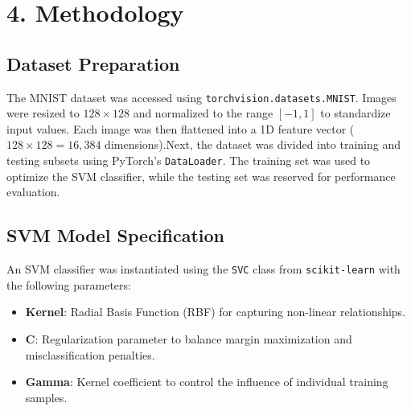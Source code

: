 \documentclass{article}
\begin{document}


\section*{4. Methodology}

\subsection*{Dataset Preparation}
The MNIST dataset was accessed using \texttt{torchvision.datasets.MNIST}. Images were resized to $128 \times 128$ and normalized to the range $[-1, 1]$ to standardize input values. Each image was then flattened into a 1D feature vector ($128 \times 128 = 16,384$ dimensions).Next, the dataset was divided into training and testing subsets using PyTorch's \texttt{DataLoader}. The training set was used to optimize the SVM classifier, while the testing set was reserved for performance evaluation.

\subsection*{SVM Model Specification}
An SVM classifier was instantiated using the \texttt{SVC} class from \texttt{scikit-learn} with the following parameters:
\begin{itemize}
    \item \textbf{Kernel}: Radial Basis Function (RBF) for capturing non-linear relationships.
    \item \textbf{C}: Regularization parameter to balance margin maximization and misclassification penalties.
    \item \textbf{Gamma}: Kernel coefficient to control the influence of individual training samples.
\end{itemize}
\end{document}
